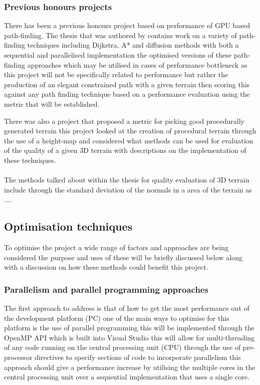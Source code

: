 \subsubsection{Previous honours projects}
There has been a previous honours project based on performance of GPU based path-finding. The thesis that was authored by \cite{honours} contains work on a variety of path-finding techniques including Dijkstra, A* and diffusion methods with both a sequential and parallelised implementation the optimised versions of these path-finding approaches which may be utilised in cases of performance bottleneck as this project will not be specifically related to performance but rather the production of an elegant constrained path with a given terrain then scoring this against any path finding technique based on a performance evaluation using the metric that will be established.


There was also a project that proposed a metric for picking good procedurally generated terrain this project looked at the creation of procedural terrain through the use of a height-map and considered what methods can be used for evaluation of the quality of a given 3D terrain with descriptions on the implementation of these techniques.\\\\The methods talked about within the thesis \cite{honours2} for quality evaluation of 3D terrain include through the standard deviation of the normals in a area of the terrain as ....%

\subsection{Optimisation techniques}
To optimise the project a wide range of factors and approaches are being considered the purpose and uses of these will be briefly discussed below along with a discussion on how these methods could benefit this project.\\

\subsubsection{Parallelism and parallel programming approaches}
The first approach to address is that of how to get the most performance out of the development platform (PC) one of the main ways to optimise for this platform is the use of parallel programming this will be implemented through the OpenMP API \cite{Openmp}which is built into Visual Studio this will allow for multi-threading of any code running on the central processing unit (CPU) through the use of pre-processor directives to specify sections of code to incorporate parallelism this approach should give a performance increase by utilising the multiple cores in the central processing unit over a sequential implementation that uses a single core.

